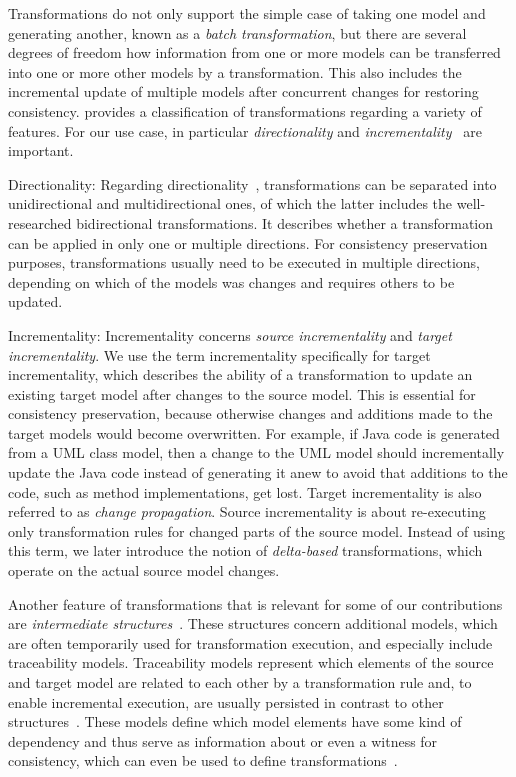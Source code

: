 Transformations do not only support the simple case of taking one model and generating another, known as a \emph{batch transformation}, but there are several degrees of freedom how information from one or more models can be transferred into one or more other models by a transformation.
This also includes the incremental update of multiple models after concurrent changes for restoring consistency.
\textcite{czarnecki2006a} provides a classification of transformations regarding a variety of features.
For our use case, in particular \emph{directionality} and \emph{incrementality}~\cite[p.~14]{czarnecki2006a} are important.
\begin{properdescription}
    \item[Directionality:] Regarding directionality~\cite[Fig.~19]{czarnecki2006a}, transformations can be separated into unidirectional and multidirectional ones, of which the latter includes the well-researched bidirectional transformations.
    It describes whether a transformation can be applied in only one or multiple directions.
    For consistency preservation purposes, transformations usually need to be executed in multiple directions, depending on which of the models was changes and requires others to be updated.
    \item[Incrementality:] Incrementality \cite[Fig.~19]{czarnecki2006a} concerns \emph{source incrementality} and \emph{target incrementality}.
    We use the term incrementality specifically for target incrementality, which describes the ability of a transformation to update an existing target model after changes to the source model. This is essential for consistency preservation, because otherwise changes and additions made to the target models would become overwritten. For example, if Java code is generated from a \gls{UML} class model, then a change to the \gls{UML} model should incrementally update the Java code instead of generating it anew to avoid that additions to the code, such as method implementations, get lost.
    Target incrementality is also referred to as \emph{change propagation}.
    Source incrementality is about re-executing only transformation rules for changed parts of the source model.
    Instead of using this term, we later introduce the notion of \emph{delta-based} transformations, which operate on the actual source model changes.
\end{properdescription}

Another feature of transformations that is relevant for some of our contributions are \emph{intermediate structures}~\cite[p.~10]{czarnecki2006a}.
These structures concern additional models, which are often temporarily used for transformation execution, and especially include traceability models.
Traceability models represent which elements of the source and target model are related to each other by a transformation rule and, to enable incremental execution, are usually persisted in contrast to other structures~\cite[p.~10]{czarnecki2006a}.
These models define which model elements have some kind of dependency and thus serve as information about or even a witness for consistency, which can even be used to define transformations~\cite{diskin2017traceabilityMappings-fse}.

